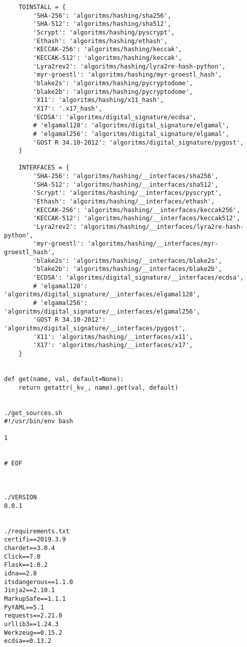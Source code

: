 \begin{lstlisting}
    TOINSTALL = {
        'SHA-256': 'algoritms/hashing/sha256',
        'SHA-512': 'algoritms/hashing/sha512',
        'Scrypt': 'algoritms/hashing/pyscrypt',
        'Ethash': 'algoritms/hashing/ethash',
        'KECCAK-256': 'algoritms/hashing/keccak',
        'KECCAK-512': 'algoritms/hashing/keccak',
        'Lyra2rev2': 'algoritms/hashing/lyra2re-hash-python',
        'myr-groestl': 'algoritms/hashing/myr-groestl_hash',
        'blake2s': 'algoritms/hashing/pycryptodome',
        'blake2b': 'algoritms/hashing/pycryptodome',
        'X11': 'algoritms/hashing/x11_hash',
        'X17': '.x17_hash',
        'ECDSA': 'algoritms/digital_signature/ecdsa',
        # 'elgamal128': 'algoritms/digital_signature/elgamal',
        # 'elgamal256': 'algoritms/digital_signature/elgamal',
        'GOST R 34.10-2012': 'algoritms/digital_signature/pygost',
    }

    INTERFACES = {
        'SHA-256': 'algoritms/hashing/__interfaces/sha256',
        'SHA-512': 'algoritms/hashing/__interfaces/sha512',
        'Scrypt': 'algoritms/hashing/__interfaces/pyscrypt',
        'Ethash': 'algoritms/hashing/__interfaces/ethash',
        'KECCAK-256': 'algoritms/hashing/__interfaces/keccak256',
        'KECCAK-512': 'algoritms/hashing/__interfaces/keccak512',
        'Lyra2rev2': 'algoritms/hashing/__interfaces/lyra2re-hash-python',
        'myr-groestl': 'algoritms/hashing/__interfaces/myr-groestl_hash',
        'blake2s': 'algoritms/hashing/__interfaces/blake2s',
        'blake2b': 'algoritms/hashing/__interfaces/blake2b',
        'ECDSA': 'algoritms/digital_signature/__interfaces/ecdsa',
        # 'elgamal128': 'algoritms/digital_signature/__interfaces/elgamal128',
        # 'elgamal256': 'algoritms/digital_signature/__interfaces/elgamal256',
        'GOST R 34.10-2012': 'algoritms/digital_signature/__interfaces/pygost',
        'X11': 'algoritms/hashing/__interfaces/x11',
        'X17': 'algoritms/hashing/__interfaces/x17',
    }


def get(name, val, default=None):
    return getattr(_kv_, name).get(val, default)


./get_sources.sh
#!/usr/bin/env bash

1


# EOF



./VERSION
0.0.1


./requirements.txt
certifi==2019.3.9
chardet==3.0.4
Click==7.0
Flask==1.0.2
idna==2.8
itsdangerous==1.1.0
Jinja2==2.10.1
MarkupSafe==1.1.1
PyYAML==5.1
requests==2.21.0
urllib3==1.24.3
Werkzeug==0.15.2
ecdsa==0.13.2
\end{lstlisting}
